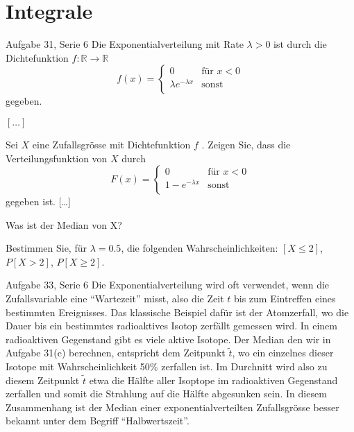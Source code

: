 \documentclass{beamer}
\begin{document}
\section{Integrale}
\begin{frame}{Aufgabe 31, Serie 6}
Die Exponentialverteilung mit Rate $\lambda > 0$ ist durch die Dichtefunktion $f : \mathbb{R} \rightarrow \mathbb{R}$
$$
f(x)=\begin{cases} 0 & \text{für } x < 0\\
     \lambda e^{-\lambda x} & \text{sonst}\\
     \end{cases}
$$
gegeben. 
\begin{outline}
\item $[\dots]$
\item Sei $X$ eine Zufallsgrösse mit Dichtefunktion $f$ . Zeigen Sie, dass die Verteilungsfunktion von $X$ durch
$$
F(x)=\begin{cases} 0 & \text{für } x < 0\\
     1-e^{-\lambda x} & \text{sonst}\\
     \end{cases}
$$
gegeben ist. [\dots]\pause
\item Was ist der Median von X?\pause
\item Bestimmen Sie, für $\lambda = 0.5$, die folgenden Wahrscheinlichkeiten: $ [X\le 2]$, $P[X >
2]$, $P[X\ge 2]$.
\end{outline}
\end{frame}

\begin{frame}{Aufgabe 33, Serie 6}
Die Exponentialverteilung wird oft verwendet, wenn die Zufallsvariable eine “Wartezeit”
misst, also die Zeit $t$ bis zum Eintreffen eines bestimmten Ereignisses. Das klassische
Beispiel dafür ist der Atomzerfall, wo die Dauer bis ein bestimmtes radioaktives Isotop
zerfällt gemessen wird. In einem radioaktiven Gegenstand gibt es viele aktive Isotope.
\vfill
Der Median den wir in Aufgabe 31(c) berechnen, entspricht dem Zeitpunkt $\tilde{t}$, wo ein
einzelnes dieser Isotope mit Wahrscheinlichkeit 50\% zerfallen ist. Im Durchnitt wird also
zu diesem Zeitpunkt $\tilde{t}$ etwa die Hälfte aller Isoptope im radioaktiven Gegenstand zerfallen
und somit die Strahlung auf die Hälfte abgesunken sein. In diesem Zusammenhang ist
der Median einer exponentialverteilten Zufallsgrösse besser bekannt unter dem Begriff
“Halbwertszeit”.
\end{frame}
\end{document}
